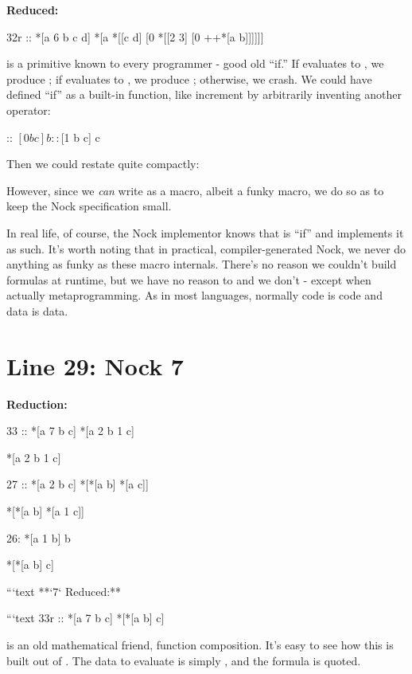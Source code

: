 \textbf{ Reduced:}
\begin{code}
	32r ::   *[a 6 b c d]               *[a *[[c d] [0 *[[2 3] [0 ++*[a b]]]]]]
\end{code}
 is a primitive known to every programmer - good old ``if.''  If  evaluates
to , we produce ; if  evaluates to , we produce ; otherwise, we
crash. We could have defined ``if'' as a built-in function, like increment
by arbitrarily inventing another operator:

\begin{code}
::    $[0 b c]         b
::    $[1 b c]         c
\end{code}
Then we could restate  quite compactly:


However, since we \emph{can} write  as a macro, albeit a funky macro, we do so
as to keep the Nock specification small.

In real life, of course, the Nock implementor knows that  is ``if'' and
implements it as such. It's worth noting that in practical, compiler-generated
Nock, we never do anything as funky as these  macro internals.  There's no
reason we couldn't build formulas at runtime, but we have no reason to and we
don't - except when actually metaprogramming.  As in most languages, normally
code is code and data is data.

\section{Line 29: Nock 7}

\textbf{ Reduction:}

\begin{code}
33 ::    *[a 7 b c]        *[a 2 b 1 c]

*[a 2 b 1 c]

27 ::    *[a 2 b c]        *[*[a b] *[a c]] 

*[*[a b] *[a 1 c]]

26:    *[a 1 b]          b
 
*[*[a b] c]
 
```text
**`7` Reduced:**

```text
33r ::     *[a 7 b c]         *[*[a b] c]
\end{code}
 is an old mathematical friend, function composition.  It's
easy to see how this is built out of .  The data to evaluate
is simply , and the formula is  quoted.

